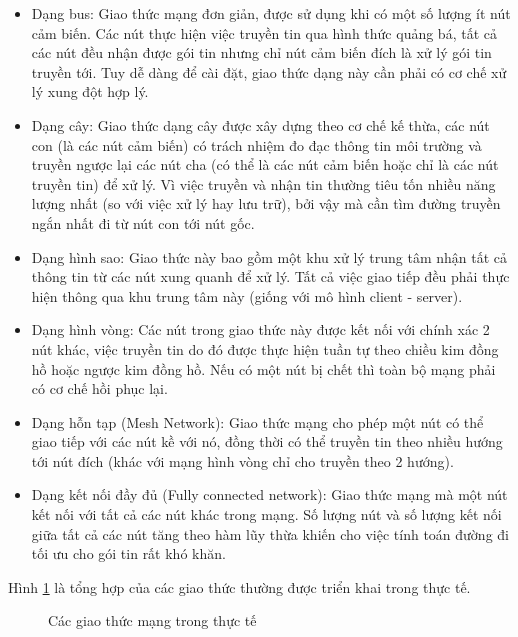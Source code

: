 \documentclass{hust}
\begin{document}
\begin{itemize}
	\item Dạng bus: Giao thức mạng đơn giản, được sử dụng khi có một số lượng ít nút cảm biến. Các nút thực hiện việc truyền tin qua hình thức quảng bá, tất cả các nút đều nhận được gói tin nhưng chỉ nút cảm biến đích là xử lý gói tin truyền tới. Tuy dễ dàng để cài đặt, giao thức dạng này cần phải có cơ chế xử lý xung đột hợp lý.
	\item Dạng cây: Giao thức dạng cây được xây dựng theo cơ chế kế thừa, các nút con (là các nút cảm biến) có trách nhiệm đo đạc thông tin môi trường và truyền ngược lại các nút cha (có thể là các nút cảm biến hoặc chỉ là các nút truyền tin) để xử lý. Vì việc truyền và nhận tin thường tiêu tốn nhiều năng lượng nhất (so với việc xử lý hay lưu trữ), bởi vậy mà cần tìm đường truyền ngắn nhất đi từ nút con tới nút gốc.
	\item Dạng hình sao: Giao thức này bao gồm một khu xử lý trung tâm nhận tất cả thông tin từ các nút xung quanh để xử lý. Tất cả việc giao tiếp đều phải thực hiện thông qua khu trung tâm này (giống với mô hình client - server). 
	\item Dạng hình vòng: Các nút trong giao thức này được kết nối với chính xác 2 nút khác, việc truyền tin do đó được thực hiện tuần tự theo chiều kim đồng hồ hoặc ngược kim đồng hồ. Nếu có một nút bị chết thì toàn bộ mạng phải có cơ chế hồi phục lại.
	\item Dạng hỗn tạp (Mesh Network): Giao thức mạng cho phép một nút có thể giao tiếp với các nút kề với nó, đồng thời có thể truyền tin theo nhiều hướng tới nút đích (khác với mạng hình vòng chỉ cho truyền theo 2 hướng).
	\item Dạng kết nối đầy đủ (Fully connected network): Giao thức mạng mà một nút kết nối với tất cả các nút khác trong mạng. Số lượng nút và số lượng kết nối giữa tất cả các nút tăng theo hàm lũy thừa khiến cho việc tính toán đường đi tối ưu cho gói tin rất khó khăn.
\end{itemize}

Hình \ref{fig:wsn-topology} là tổng hợp của các giao thức thường được triển khai trong thực tế.


\begin{figure}[htb]
	\caption{Các giao thức mạng trong thực tế}\label{fig:wsn-topology}
\end{figure}
\end{document}

